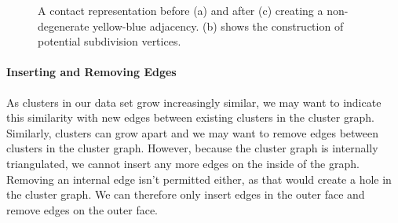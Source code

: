 \begin{figure}[H]
	\centering
	\quad
	\quad
	\caption{A contact representation before (a) and after (c) creating a non-degenerate yellow-blue adjacency. (b) shows the construction of potential subdivision vertices.}
	\label{fig:flip-edge-create-boundary}
\end{figure}



\paragraph{Inserting and Removing Edges}

As clusters in our data set grow increasingly similar, we may want to indicate this similarity with new edges between existing clusters in the cluster graph. Similarly, clusters can grow apart and we may want to remove edges between clusters in the cluster graph. However, because the cluster graph is internally triangulated, we cannot insert any more edges on the inside of the graph. Removing an internal edge isn't permitted either, as that would create a hole in the cluster graph. We can therefore only insert edges in the outer face and remove edges on the outer face.

